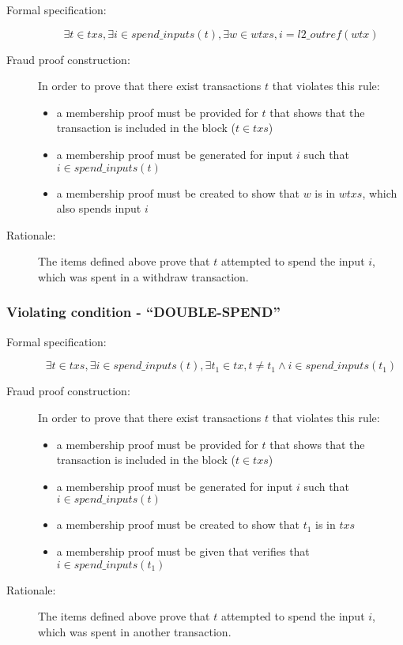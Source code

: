 \documentclass[../midgard.tex]{subfiles}
\begin{document}
\begin{description}

\item[Formal specification:]
\begin{equation*}
    \exists t \in txs, \exists i \in spend\_inputs(t), \exists w \in wtxs, i = l2\_outref(wtx)
\end{equation*}

\item[Fraud proof construction:] In order to prove that there exist transactions $t$ that violates this rule:
\begin{itemize}
    \item a membership proof must be provided for $t$ that shows that the transaction is included in the block ($t \in txs$)
    \item a membership proof must be generated for input $i$ such that $i \in spend\_inputs(t)$
    \item a membership proof must be created to show that $w$ is in $wtxs$, which also spends input $i$
\end{itemize}

\item[Rationale:] The items defined above prove that $t$ attempted to spend the input $i$, which was spent in a withdraw transaction.

\end{description}

\subsubsection{Violating condition - ``DOUBLE-SPEND''}
\label{sec:DOUBLE-SPEND}

\begin{description}

\item[Formal specification:]
\begin{equation*}
    \exists t \in txs, \exists i \in spend\_inputs(t), \exists t_1 \in tx, t \neq t_1 \land i \in spend\_inputs(t_1)
\end{equation*}

\item[Fraud proof construction:] In order to prove that there exist transactions $t$ that violates this rule:
\begin{itemize}
    \item a membership proof must be provided for $t$ that shows that the transaction is included in the block ($t \in txs$)
    \item a membership proof must be generated for input $i$ such that $i \in spend\_inputs(t)$
    \item a membership proof must be created to show that $t_1$ is in $txs$
    \item a membership proof must be given that verifies that $i \in spend\_inputs(t_1)$
\end{itemize}

\item[Rationale:] The items defined above prove that $t$ attempted to spend the input $i$, which was spent in another transaction.

\end{description}
\end{document}
